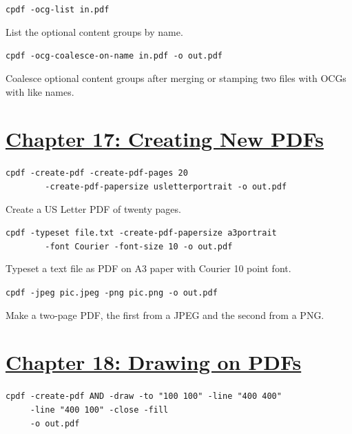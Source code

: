 \documentclass{book}
\begin{document}
\begin{framed}\noindent\texttt{cpdf -ocg-list in.pdf}\end{framed}

\noindent List the optional content groups by name.

\begin{framed}\noindent\texttt{cpdf -ocg-coalesce-on-name in.pdf -o out.pdf}\end{framed}

\noindent Coalesce optional content groups after merging or stamping two files with OCGs with like names.

\section*{\hyperref[chap:17]{Chapter 17: Creating New PDFs}}

\begin{framed}
 \small\verb?cpdf -create-pdf -create-pdf-pages 20?\\
 \noindent\small\verb?        -create-pdf-papersize usletterportrait -o out.pdf?
\end{framed}

\noindent Create a US Letter PDF of twenty pages.

\begin{framed}
 \small\verb?cpdf -typeset file.txt -create-pdf-papersize a3portrait?\\
 \noindent\small\verb?        -font Courier -font-size 10 -o out.pdf?
\end{framed}

\noindent Typeset a text file as PDF on A3 paper with Courier 10 point font.

\begin{framed}\noindent\texttt{cpdf -jpeg pic.jpeg -png pic.png -o out.pdf}\end{framed}

\noindent Make a two-page PDF, the first from a JPEG and the second from a PNG.

\section*{\hyperref[chap:18]{Chapter 18: Drawing on PDFs}}

\begin{framed}
 \noindent\small\verb?cpdf -create-pdf AND -draw -to "100 100" -line "400 400"?\\
 \noindent\small\verb?     -line "400 100" -close -fill?\\
 \noindent\small\verb?     -o out.pdf?
\end{framed}
\end{document}
